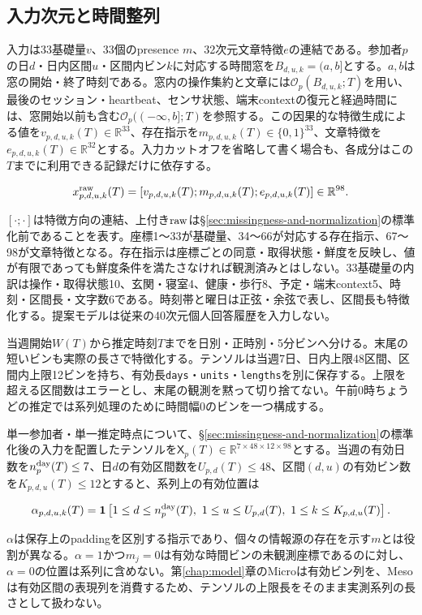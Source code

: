 \subsection{入力次元と時間整列}

入力は33基礎量\(v\)、33個のpresence \(m\)、32次元文章特徴\(e\)の連結である。参加者\(p\)の日\(d\)・日内区間\(u\)・区間内ビン\(k\)に対応する時間窓を\(B_{d,u,k}=(a,b]\)とする。\(a,b\)は窓の開始・終了時刻である。窓内の操作集約と文章には\(\mathcal O_p(B_{d,u,k};T)\)を用い、最後のセッション・heartbeat、センサ状態、端末contextの復元と経過時間には、窓開始以前も含む\(\mathcal O_p((-\infty,b];T)\)を参照する。この因果的な特徴生成による値を\(v_{p,d,u,k}(T)\in\mathbb R^{33}\)、存在指示を\(m_{p,d,u,k}(T)\in\{0,1\}^{33}\)、文章特徴を\(e_{p,d,u,k}(T)\in\mathbb R^{32}\)とする。入力カットオフを省略して書く場合も、各成分はこの\(T\)までに利用できる記録だけに依存する。

\[
x_{p,d,u,k}^{\rm raw}(T)=
[v_{p,d,u,k}(T);m_{p,d,u,k}(T);e_{p,d,u,k}(T)]
\in\mathbb R^{98}.
\]

\([\cdot;\cdot]\)は特徴方向の連結、上付き\(\rm raw\)は§\ref{sec:missingness-and-normalization}の標準化前であることを表す。座標1〜33が基礎量、34〜66が対応する存在指示、67〜98が文章特徴となる。存在指示は座標ごとの同意・取得状態・鮮度を反映し、値が有限であっても鮮度条件を満たさなければ観測済みとはしない。33基礎量の内訳は操作・取得状態10、玄関・寝室4、健康・歩行8、予定・端末context5、時刻・区間長・文字数6である。時刻帯と曜日は正弦・余弦で表し、区間長も特徴化する。提案モデルは従来の40次元個人回答履歴を入力しない。

当週開始\(W(T)\)から推定時刻\(T\)までを日別・正時別・5分ビンへ分ける。末尾の短いビンも実際の長さで特徴化する。テンソルは当週7日、日内上限48区間、区間内上限12ビンを持ち、有効長\texttt{days}・\texttt{units}・\texttt{lengths}を別に保存する。上限を超える区間数はエラーとし、末尾の観測を黙って切り捨てない。午前0時ちょうどの推定では系列処理のために時間幅0のビンを一つ構成する。

単一参加者・単一推定時点について、§\ref{sec:missingness-and-normalization}の標準化後の入力を配置したテンソルを\(\mathsf X_p(T)\in\mathbb R^{7\times48\times12\times98}\)とする。当週の有効日数を\(n_p^{\rm day}(T)\le7\)、日\(d\)の有効区間数を\(U_{p,d}(T)\le48\)、区間\((d,u)\)の有効ビン数を\(K_{p,d,u}(T)\le12\)とすると、系列上の有効位置は

\[
\alpha_{p,d,u,k}(T)=
\mathbf1\left[
1\le d\le n_p^{\rm day}(T),\
1\le u\le U_{p,d}(T),\
1\le k\le K_{p,d,u}(T)
\right].
\]

\(\alpha\)は保存上のpaddingを区別する指示であり、個々の情報源の存在を示す\(m\)とは役割が異なる。\(\alpha=1\)かつ\(m_j=0\)は有効な時間ビンの未観測座標であるのに対し、\(\alpha=0\)の位置は系列に含めない。第\ref{chap:model}章のMicroは有効ビン列を、Mesoは有効区間の表現列を消費するため、テンソルの上限長をそのまま実測系列の長さとして扱わない。

